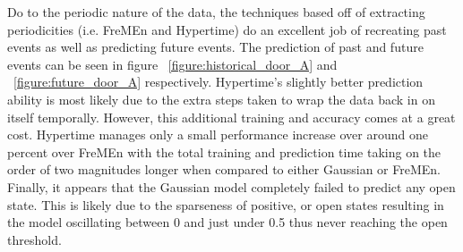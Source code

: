 Do to the periodic nature of the data, the techniques based off of extracting
periodicities (i.e. FreMEn and Hypertime) do an excellent job of recreating
past events as well as predicting future events. The prediction of past and future events can be seen in
figure ~\ref{figure:historical_door_A} and ~\ref{figure:future_door_A} respectively. Hypertime's slightly better
prediction ability is most likely due to the extra steps taken to wrap the data back
in on itself temporally. However, this additional training and accuracy comes at a
great cost. Hypertime manages only a small performance increase over
around one percent over FreMEn with the total training and prediction time
taking on the order of two magnitudes longer when compared to either Gaussian or FreMEn.
Finally, it appears that the Gaussian model completely failed to predict any
open state. This is likely due to the sparseness of positive, or open
states resulting in the model oscillating between 0 and just under 0.5 thus
never reaching the open threshold. \\


